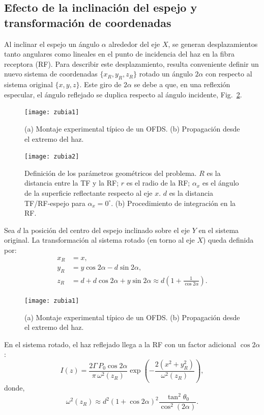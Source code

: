 \documentclass[11pt,a4paper]{article}
\begin{document}
\begin{multicols}{2}
\subsection{Efecto de la inclinación del espejo y transformación de coordenadas}
\label{sec:5_01_03}
Al inclinar el espejo un ángulo $\alpha$ alrededor del eje $X$, se generan desplazamientos tanto angulares como lineales en el punto de incidencia del haz en la fibra receptora (RF). Para describir este desplazamiento, resulta conveniente definir un nuevo sistema de coordenadas $\{x_R,y_R,z_R\}$ rotado un ángulo $2\alpha$ con respecto al sistema original $\{x,y,z\}$. Este giro de $2\alpha$ se debe a que, en una reflexión especular, el ángulo reflejado se duplica respecto al ángulo incidente, Fig.~\ref{fig:5_02}.
\begin{figure}[H]
    \centering
    \texttt{[image: zubia1]}
    \caption{(a) Montaje experimental típico de un OFDS. (b) Propagación desde el extremo del haz.}
    \label{fig:2_01}
\end{figure}
\unskip
%
%
\begin{figure}[H]
    \centering
    \texttt{[image: zubia2]}
    \caption{Definición de los parámetros geométricos del problema. $R$ es la distancia entre la TF y la RF; $r$ es el radio de la RF; $\alpha_x$ es el ángulo de la superficie reflectante respecto al eje $x$. $d$ es la distancia TF/RF-espejo para $\alpha_x=0^\circ$. (b) Procedimiento de integración en la RF.}
    \label{fig:5_02}
\end{figure}
%
%
\unskip
Sea $d$ la posición del centro del espejo inclinado sobre el eje $Y$ en el sistema original. La transformación al sistema rotado (en torno al eje $X$) queda definida por:
\begin{align}
    x_R &= x,\\[6pt]
    y_R &= y \cos 2\alpha - d \sin 2\alpha,\\[6pt]
    z_R &= d + d \cos 2\alpha + y\sin 2\alpha \approx d\left(1 + \frac{1}{\cos 2\alpha}\right).
    \label{eq:equ2}
\end{align}
\begin{figure}[t]
    \centering
    \texttt{[image: zubia1]}
    \caption{(a) Montaje experimental típico de un OFDS. (b) Propagación desde el extremo del haz.}
    \label{fig:2_01}
\end{figure}
\unskip
\noindent En el sistema rotado, el haz reflejado llega a la RF con un factor adicional $\cos 2\alpha$:
\begin{equation}
    I(z)=\frac{2\Gamma\,P_0 \cos 2\alpha}{\pi\,\omega^2(z_{R})}\exp\!\left(-\frac{2(x^2 + y_R^2)}{\omega^2(z_{R})}\right),
    \label{eq:equ3}
\end{equation}
donde,
\begin{equation}
    \omega^2(z_{R})\approx d^2 (1+\cos 2\alpha)^2\frac{\tan^2 \theta_0}{\cos^2(2\alpha)}.
\end{equation}

\end{multicols}
\end{document}
